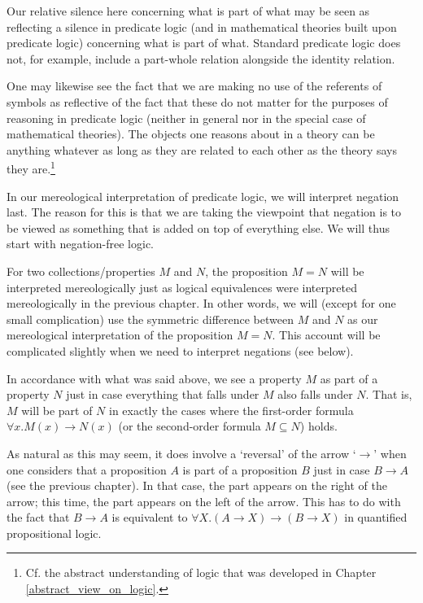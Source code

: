 \documentclass[12pt]{book}
\begin{document}
Our relative silence here concerning what is part of what may be seen as reflecting a silence in predicate logic (and in mathematical theories built upon predicate logic) concerning what is part of what. Standard predicate logic does not, for example, include a part-whole relation alongside the identity relation.

One may likewise see the fact that we are making no use of the referents of symbols as reflective of the fact that these do not matter for the purposes of reasoning in predicate logic (neither in general nor in the special case of mathematical theories). The objects one reasons about in a theory can be anything whatever as long as they are related to each other as the theory says they are.\footnote{Cf. the abstract understanding of logic that was developed in Chapter \ref{abstract_view_on_logic}.}

In our mereological interpretation of predicate logic, we will interpret negation last. The reason for this is that we are taking the viewpoint that negation is to be viewed as something that is added on top of everything else. We will thus start with negation-free logic.

For two collections/properties $M$ and $N$, the proposition $M = N$ will be interpreted mereologically just as logical equivalences were interpreted mereologically in the previous chapter. In other words, we will (except for one small complication) use the symmetric difference between $M$ and $N$ as our mereological interpretation of the proposition $M = N$. This account will be complicated slightly when we need to interpret negations (see below).

In accordance with what was said above, we see a property $M$ as part of a property $N$ just in case everything that falls under $M$ also falls under $N$. That is, $M$ will be part of $N$ in exactly the cases where the first-order formula $\forall x.M(x) \rightarrow N(x)$ (or the second-order formula $M \subseteq N$) holds.

As natural as this may seem, it does involve a ‘reversal’ of the arrow ‘$\rightarrow$’ when one considers that a proposition $A$ is part of a proposition $B$ just in case $B \rightarrow A$ (see the previous chapter). In that case, the part appears on the right of the arrow; this time, the part appears on the left of the arrow. This has to do with the fact that $B \rightarrow A$ is equivalent to $\forall X.(A \rightarrow X) \rightarrow (B \rightarrow X)$ in quantified propositional logic.
\end{document}
